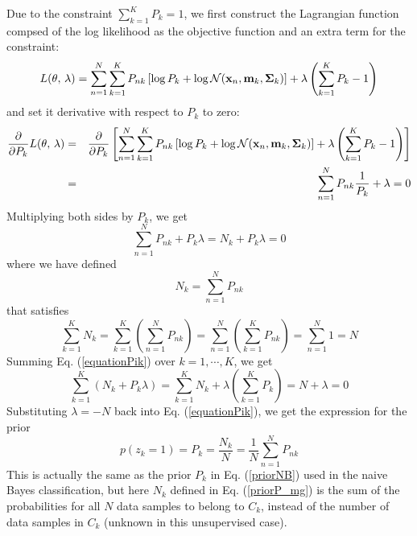 \documentclass{article}
\begin{document}
\begin{itemize}
\begin{itemize}
    Due to the constraint $\sum_{k=1}^K P_k=1$, we first construct the
    Lagrangian function compsed of the log likelihood as the objective 
    function and an extra term for the constraint:
    \begin{equation}
      L(\theta,\,\lambda)
      =\sum_{n=1}^N \sum_{k=1}^K P_{nk}
      \left[\log P_k+\log {\cal N}({\bf x}_n,{\bf m}_k,{\bf\Sigma}_k)\right]
      +\lambda\left(\sum_{k=1}^K P_k-1\right)
    \end{equation}
    and set it derivative with respect to $P_k$ to zero:
    \begin{eqnarray}
      \frac{\partial}{\partial P_k} L(\theta,\,\lambda)
      &=&\frac{\partial}{\partial P_k} \left[
        \sum_{n=1}^N \sum_{k=1}^K P_{nk}
        \left[\log P_k+\log {\cal N}({\bf x}_n,{\bf m}_k,{\bf\Sigma}_k)\right]
        +\lambda\left(\sum_{k=1}^K P_k-1\right) \right]
      \nonumber\\
      &=&\sum_{n=1}^N P_{nk}\frac{1}{P_k}+\lambda=0
    \end{eqnarray}
    Multiplying both sides by $P_k$, we get
    \begin{equation}
      \sum_{n=1}^N P_{nk}+P_k \lambda=N_k+P_k\lambda=0
      \label{equationPik}
    \end{equation}
    where we have defined
    \begin{equation}
      N_k=\sum_{n=1}^N P_{nk}
      \label{priorP_mg}
    \end{equation}    
    that satisfies
    \begin{equation}
      \sum_{k=1}^K N_k=\sum_{k=1}^K\left(\sum_{n=1}^N P_{nk}\right)
      =\sum_{n=1}^N\left(\sum_{k=1}^K P_{nk}\right)=\sum_{n=1}^N 1=N
    \end{equation}
    Summing Eq. (\ref{equationPik}) over $k=1,\cdots,K$, we get
    \begin{equation}
      \sum_{k=1}^K\left(N_k+P_k \lambda\right)
      =\sum_{k=1}^K N_k+\lambda\left(\sum_{k=1}^K P_k\right)
      =N+\lambda=0
    \end{equation}
    Substituting $\lambda=-N$ back into Eq. (\ref{equationPik}), 
    we get the expression for the prior
    \begin{equation}
      p(z_k=1)=P_k=\frac{N_k}{N}=\frac{1}{N}\sum_{n=1}^N P_{nk}
    \end{equation}
    This is actually the same as the prior $P_k$ in Eq. (\ref{priorNB})
    used in the naive Bayes classification, but here $N_k$ defined in 
    Eq. (\ref{priorP_mg}) is the sum of the probabilities for all $N$ 
    data samples to belong to $C_k$, instead of the number of data
    samples in $C_k$ (unknown in this unsupervised case).


\end{itemize}
\end{itemize}
\end{document}
